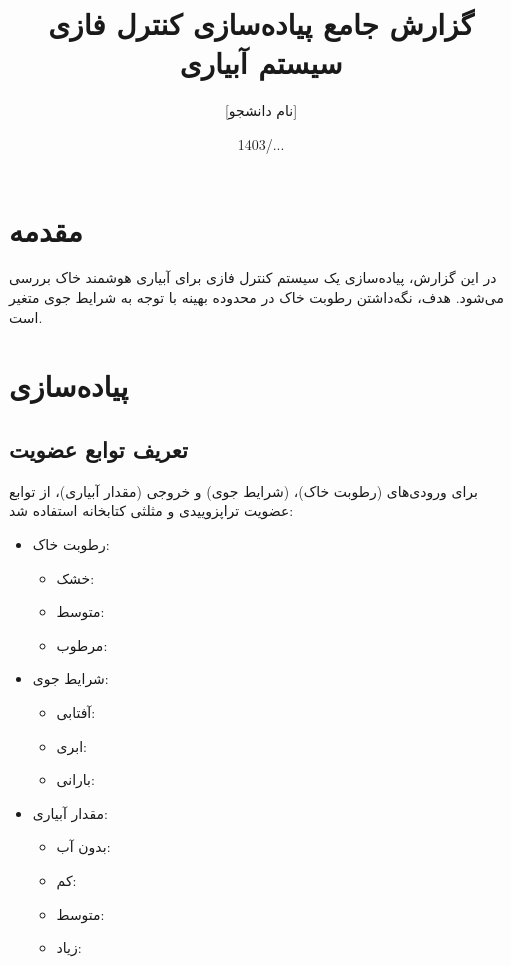 \documentclass[a4paper,12pt]{article}
\title{گزارش جامع پیاده‌سازی کنترل فازی سیستم آبیاری}
\author{[نام دانشجو]}
\date{1403/...}
\begin{document}
	\maketitle
	
	\section{مقدمه}
	در این گزارش، پیاده‌سازی یک سیستم کنترل فازی برای آبیاری هوشمند خاک بررسی می‌شود. هدف، نگه‌داشتن رطوبت خاک در محدوده بهینه با توجه به شرایط جوی متغیر است.
	
	\section{پیاده‌سازی}
	
	\subsection{تعریف توابع عضویت}
	برای ورودی‌های  (رطوبت خاک)،  (شرایط جوی) و خروجی  (مقدار آبیاری)، از توابع عضویت تراپزوییدی و مثلثی کتابخانه  استفاده شد:
	\begin{itemize}
		\item رطوبت خاک:
		\begin{itemize}
			\item خشک: 
			\item متوسط: 
			\item مرطوب: 
		\end{itemize}
		\item شرایط جوی:
		\begin{itemize}
			\item آفتابی: 
			\item ابری: 
			\item بارانی: 
		\end{itemize}
		\item مقدار آبیاری:
		\begin{itemize}
			\item بدون آب: 
			\item کم: 
			\item متوسط: 
			\item زیاد: 
		\end{itemize}
	\end{itemize}
	
\end{document}
